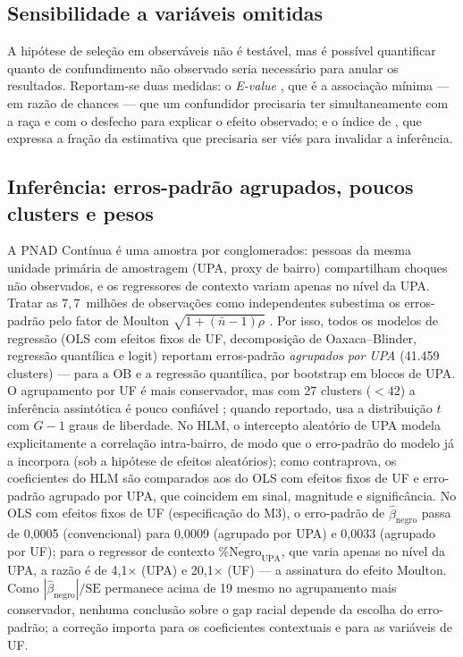 \documentclass[12pt, a4paper, oneside]{article}
\let\oldsubsectionFB\subsection
\renewcommand{\subsection}{\FloatBarrier\oldsubsectionFB}
\begin{document}
\subsection{Sensibilidade a variáveis omitidas}

A hipótese de seleção em observáveis não é testável, mas é possível quantificar
quanto de confundimento não observado seria necessário para anular os
resultados. Reportam-se duas medidas: o \emph{E-value}
\cite{vanderweele2017}, que é a associação mínima --- em razão de chances ---
que um confundidor precisaria ter simultaneamente com a raça e com o desfecho
para explicar o efeito observado; e o índice de , que
expressa a fração da estimativa que precisaria ser viés para invalidar a
inferência.

\subsection{Inferência: erros-padrão agrupados, poucos clusters e pesos}
\label{subsec:inferencia}

A PNAD Contínua é uma amostra por conglomerados: pessoas da mesma unidade primária de amostragem (UPA, proxy de bairro) compartilham choques não observados, e os regressores de contexto variam apenas no nível da UPA. Tratar as $7{,}7$~milhões de observações como independentes subestima os erros-padrão pelo fator de Moulton $\sqrt{1+(\bar n-1)\rho}$ \cite{angrist2009}. Por isso, todos os modelos de regressão (OLS com efeitos fixos de UF, decomposição de Oaxaca--Blinder, regressão quantílica e logit) reportam erros-padrão \emph{agrupados por UPA} (41.459 clusters) --- para a OB e a regressão quantílica, por bootstrap em blocos de UPA. O agrupamento por UF é mais conservador, mas com 27 clusters ($<42$) a inferência assintótica é pouco confiável \cite{angrist2009}; quando reportado, usa a distribuição $t$ com $G-1$ graus de liberdade. No HLM, o intercepto aleatório de UPA modela explicitamente a correlação intra-bairro, de modo que o erro-padrão do modelo já a incorpora (sob a hipótese de efeitos aleatórios); como contraprova, os coeficientes do HLM são comparados aos do OLS com efeitos fixos de UF e erro-padrão agrupado por UPA, que coincidem em sinal, magnitude e significância. No OLS com efeitos fixos de UF (especificação do M3), o erro-padrão de $\hat\beta_{\text{negro}}$ passa de 0,0005 (convencional) para 0,0009 (agrupado por UPA) e 0,0033 (agrupado por UF); para o regressor de contexto $\overline{\%\text{Negro}}_{\text{UPA}}$, que varia apenas no nível da UPA, a razão é de 4,1$\times$ (UPA) e 20,1$\times$ (UF) --- a assinatura do efeito Moulton. Como $|\hat\beta_{\text{negro}}|/\text{SE}$ permanece acima de 19 mesmo no agrupamento mais conservador, nenhuma conclusão sobre o gap racial depende da escolha do erro-padrão; a correção importa para os coeficientes contextuais e para as variáveis de UF. 
\end{document}
